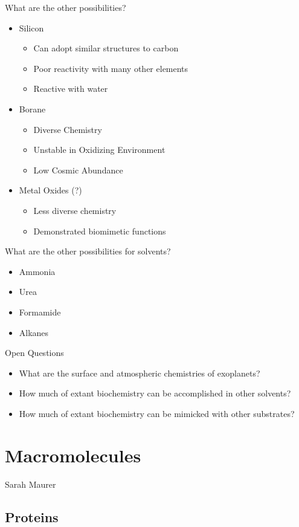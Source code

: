\documentclass[]{article}
\begin{document}
What are the other possibilities?
\begin{itemize}
	\item Silicon
	\begin{itemize}
		\item Can adopt similar structures to carbon
		\item Poor reactivity with many other elements
		\item Reactive with water
	\end{itemize}
	\item Borane
	\begin{itemize}
		\item Diverse Chemistry
		\item Unstable in Oxidizing Environment
		\item Low Cosmic Abundance
	\end{itemize}
	\item Metal Oxides (?)
\begin{itemize}
	\item 	Less diverse chemistry
	\item Demonstrated biomimetic functions
\end{itemize}
\end{itemize}

What are the other possibilities for solvents?
\begin{itemize}
	\item Ammonia
	\item Urea
	\item Formamide
	\item Alkanes
\end{itemize}

Open Questions
\begin{itemize}
	\item What are the surface and atmospheric chemistries of
	exoplanets?
	\item How much of extant biochemistry can be accomplished
	in other solvents?
	\item How much of extant biochemistry can be mimicked with
	other substrates?
\end{itemize}
\section{Macromolecules}

Sarah Maurer

\subsection{Proteins}
\end{document}

